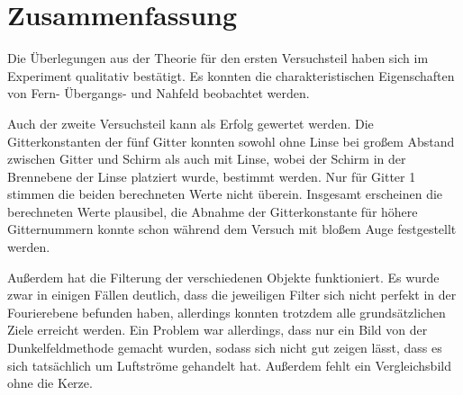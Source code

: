 \newpage

\section{Zusammenfassung}



Die Überlegungen aus der Theorie für den ersten Versuchsteil haben sich im  Experiment qualitativ bestätigt. Es konnten die charakteristischen Eigenschaften von Fern- Übergangs- und Nahfeld beobachtet werden.

Auch der zweite Versuchsteil kann als Erfolg gewertet werden. Die Gitterkonstanten der fünf Gitter konnten sowohl ohne Linse bei großem Abstand zwischen Gitter und Schirm als auch mit Linse, wobei der Schirm in der Brennebene der Linse platziert wurde, bestimmt werden. Nur für Gitter 1 stimmen die beiden berechneten Werte nicht überein. Insgesamt erscheinen die berechneten Werte plausibel, die Abnahme der Gitterkonstante für höhere Gitternummern konnte schon während dem Versuch mit bloßem Auge festgestellt werden.




Außerdem hat die Filterung der verschiedenen Objekte funktioniert. Es wurde zwar in einigen Fällen deutlich, dass die jeweiligen Filter sich nicht perfekt in der Fourierebene befunden haben, allerdings konnten trotzdem alle grundsätzlichen Ziele erreicht werden. Ein Problem war allerdings, dass nur ein Bild von der Dunkelfeldmethode gemacht wurden, sodass sich nicht gut zeigen lässt, dass es sich tatsächlich um Luftströme gehandelt hat. Außerdem fehlt ein Vergleichsbild ohne die Kerze. 
